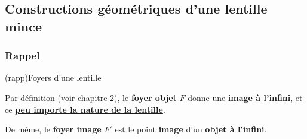 \documentclass[../../main/main.tex]{subfiles}
\begin{document}
\subsection{Constructions géométriques d'une lentille mince}
\subsubsection{Rappel}

\begin{tcb}[label=rapp:foy](rapp){Foyers d'une lentille}

	Par définition (voir chapitre 2), le \textbf{foyer objet} $F$ donne une
	\textbf{image à l'infini}, et ce \textbf{\underline{peu importe la nature de
			la lentille}}.\bigbreak

	De même, le \textbf{foyer image} $F'$ est le point \textbf{image} d'un
	\textbf{objet à l'infini}.

\end{tcb}
\end{document}
